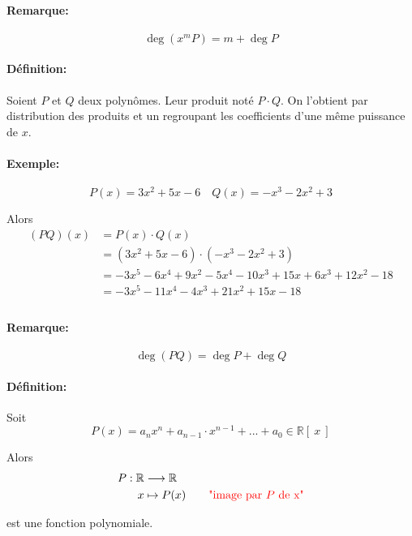 \documentclass[
    11pt,
    a4paper,
    oneside,
    headinlcude, footinclude,
    twoside,
]{report}
\renewcommand{\to}[0]{\longrightarrow}
\begin{document}
\paragraph{Remarque:}

$$\deg (x^{m}P) = m + \deg P$$


\paragraph{Définition:}

Soient $P$ et $Q$ deux polynômes. Leur produit noté $P \cdot Q$. On l'obtient
par distribution des produits et un regroupant les coefficients d'une même
puissance de $x$.

\paragraph{Exemple:}

$$P(x) = 3x^{2} + 5x -6 \quad Q(x) = -x^{3} -2x^{2} +3$$

Alors
\[
    \begin{split}
        (PQ)(x) & = P(x) \cdot Q(x)\\
        &= (3x^{2} + 5x - 6) \cdot(-x^{3} -2x^{2} + 3)\\
        &=-3x^{5}-6x^{4}+9x^{2} - 5x^{4} -10x^{3}+15x+6x^{3}+12x^{2}-18\\
        &=-3x^{5} -11 x^{4} -4x^{3} +21 x^{2} + 15x -18\\
    \end{split}
\]

\paragraph{Remarque:}

$$\deg (PQ) = \deg P + \deg Q$$

\paragraph{Définition:}

Soit $$P(x) = a_{n}x^{n}+ a_{n-1}\cdot x^{n-1}+ ... +  a_{0} \in \mathbb{R}[\
x\ ]$$

Alors
\[
    \begin{split}
        P: \mathbb{R} & \to \mathbb{R}\\
        x&\mapsto P(x) \quad \quad \text{{\color{red} "image par $P$ de x"}}
    \end{split}
\]


est une fonction polynomiale.
\end{document}
